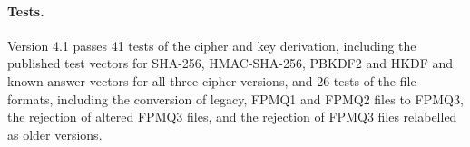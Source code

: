 \paragraph{Tests.} Version 4.1 passes 41 tests of the cipher and key
derivation, including the published test vectors for SHA-256, HMAC-SHA-256,
PBKDF2 and HKDF and known-answer vectors for all three cipher versions, and 26
tests of the file formats, including the conversion of legacy, FPMQ1 and FPMQ2
files to FPMQ3, the rejection of altered FPMQ3 files, and the rejection of FPMQ3
files relabelled as older versions.

\clearpage





